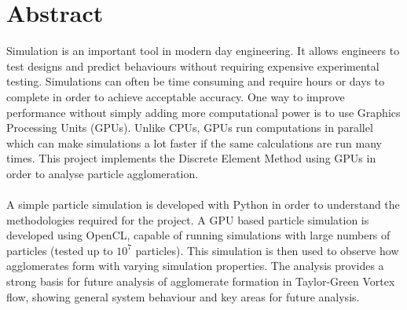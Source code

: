 \documentclass[a4paper,11pt,titlepage]{report}
\begin{document}
\chapter*{Abstract}
Simulation is an important tool in modern day engineering. It allows engineers to test designs and predict behaviours
without requiring expensive experimental testing. Simulations can often be time consuming and require hours or days to complete in order to achieve acceptable accuracy. One way to improve performance without simply adding more computational power is to use Graphics Processing Units (GPUs). Unlike CPUs, GPUs run computations in parallel which can make simulations a lot faster if the same calculations are run many times. This project implements the Discrete Element Method using GPUs in order to analyse particle agglomeration.
\\\\A simple particle simulation is developed with Python in order to understand the methodologies required for the project. A GPU based particle simulation is developed using OpenCL, capable of running simulations with large numbers of particles (tested up to $10^7$ particles). This simulation is then used to observe how agglomerates form with varying simulation properties. The analysis provides a strong basis for future analysis of agglomerate formation in Taylor-Green Vortex flow, showing general system behaviour and key areas for future analysis.
\end{document}
